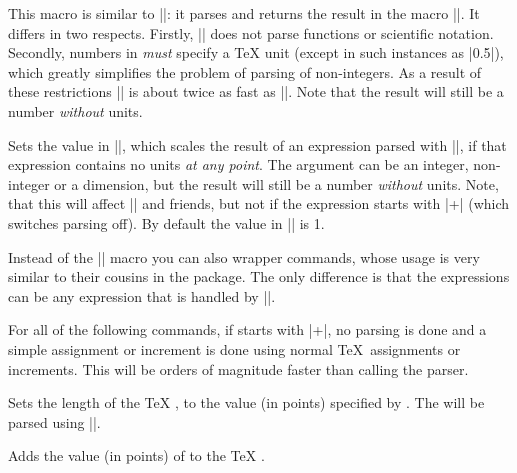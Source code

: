 \begin{command}{\pgfmathqparse{}}
  This macro is similar to |\pgfmathparse|: it parses 
   and returns the result in the macro 
  |\pgfmathresult|. It differs in two respects. Firstly, 
  |\pgfmathqparse| does not parse functions or scientific
  notation. 
  Secondly, numbers in  \emph{must}
  specify a \TeX{} unit (except in such instances as |0.5\pgf@x|), 
  which greatly simplifies the problem of parsing 
  of non-integers. As a result of these restrictions |\pgfmathqparse| 
  is about twice as fast as |\pgfmathparse|. Note that the result 
  will still be a number \emph{without} units.	
\end{command}

\begin{command}{\pgfmathsetresultunitscale{}}
  Sets the value in |\pgfmathresultunitscale|, which scales the result
  of an expression parsed with |\pgfmathparse|, if that expression
  contains no units \emph{at any point}. The argument can be an integer,
  non-integer or a dimension, but the result will still be a number 
  \emph{without} units. Note, that this will affect |\pgfmathsetlength| 
  and friends, but not if the expression starts with |+| (which
  switches parsing off). By default the value in
  |\pgfmathresultunitscale| is 1. 
\end{command}

Instead of the |\pgfmathparse| macro you can also wrapper commands,
whose usage is very similar to their cousins in the \calcname{} 
package. The only difference is that the expressions can be any
expression that is handled by |\pgfmathparse|.

For all of the following commands, if  starts with
|+|, no parsing is done and a simple assignment or increment is done
using normal \TeX\ assignments or increments. This will be orders of
magnitude faster than calling the parser. 

\begin{command}{\pgfmathsetlength{}}
  Sets the length of the \TeX{} , to the value
  (in points) specified by . The 
  will be parsed using |\pgfmathparse|.
\end{command}

\begin{command}{\pgfmathaddtolength{}}
  Adds the value (in points) of  to the \TeX{} 
  . 
\end{command}

